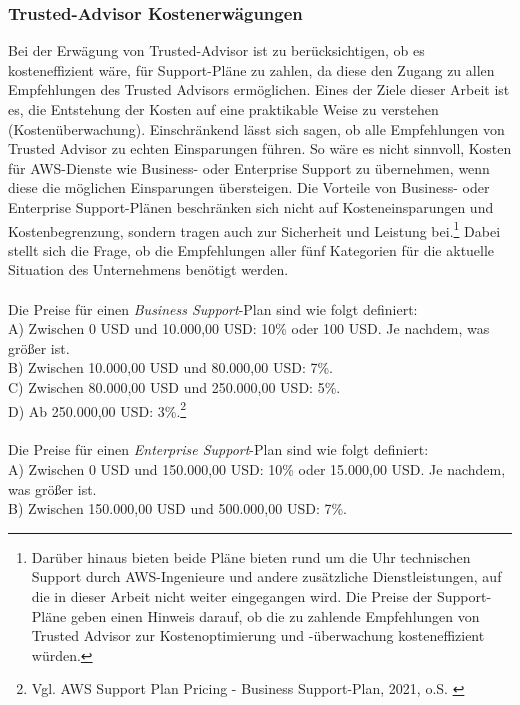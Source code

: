 \subsubsection*{Trusted-Advisor Kostenerwägungen}
Bei der Erwägung von Trusted-Advisor ist zu berücksichtigen, ob es kosteneffizient wäre, für Support-Pläne zu zahlen, da diese den Zugang zu allen Empfehlungen des Trusted Advisors ermöglichen. Eines der Ziele dieser Arbeit ist es, die Entstehung der Kosten auf eine praktikable Weise zu verstehen (Kostenüberwachung). Einschränkend lässt sich sagen, ob alle Empfehlungen von Trusted Advisor zu echten Einsparungen führen. %
So wäre es nicht sinnvoll, Kosten für AWS-Dienste wie Business- oder Enterprise Support zu übernehmen, wenn diese die möglichen Einsparungen übersteigen. Die Vorteile von Business- oder Enterprise Support-Plänen beschränken sich nicht auf Kosteneinsparungen und Kostenbegrenzung, sondern tragen auch zur Sicherheit und Leistung bei.\footnote{Darüber hinaus bieten beide Pläne bieten rund um die Uhr technischen Support durch AWS-Ingenieure und andere zusätzliche Dienstleistungen, auf die in dieser Arbeit nicht weiter eingegangen wird. Die Preise der Support-Pläne geben einen Hinweis darauf, ob die zu zahlende Empfehlungen von Trusted Advisor zur Kostenoptimierung und -überwachung kosteneffizient würden.} Dabei stellt sich die Frage, ob die Empfehlungen aller fünf Kategorien für die aktuelle Situation des Unternehmens benötigt werden.
\\\\   
Die Preise für einen \textit{Business Support}-Plan sind wie folgt definiert: 
\\
A) Zwischen 0 USD und 10.000,00 USD: 10\% oder 100 USD. Je nachdem, was größer ist.\\
B) Zwischen 10.000,00 USD und 80.000,00 USD: 7\%.\\
C) Zwischen 80.000,00 USD und 250.000,00 USD: 5\%.\\
D) Ab 250.000,00 USD: 3\%.\footnote{Vgl.  AWS Support Plan Pricing - Business Support-Plan, 2021, o.S. \cite{AMZ38}}
\\\\
Die Preise für einen \textit{Enterprise Support}-Plan sind wie folgt definiert:
\\
A) Zwischen 0 USD und 150.000,00 USD: 10\% oder 15.000,00 USD. Je nachdem, was größer ist.\\
B) Zwischen 150.000,00 USD und 500.000,00 USD: 7\%.\\
